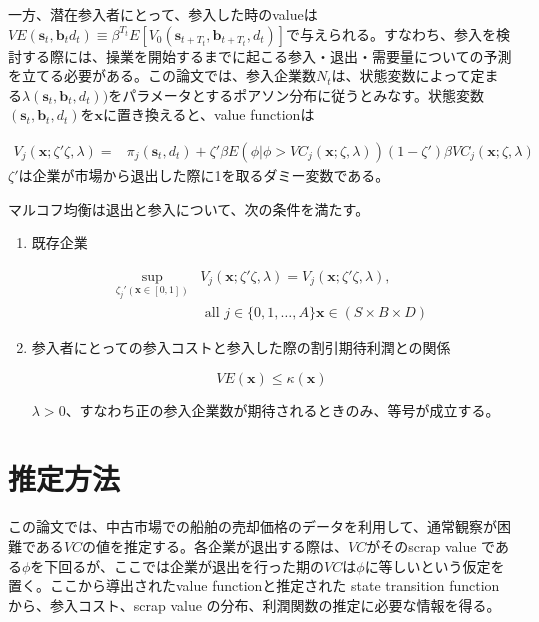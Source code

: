 \documentclass[11pt]{jsarticle}
\begin{document}
一方、潜在参入者にとって、参入した時のvalueは$VE(\mathbf{s}_t, \mathbf{b}_t d_t) \equiv \beta^{T_t}E[V_0(\mathbf{s}_{t+T_t}, \mathbf{b}_{t+T_t}, d_t)]$で与えられる。すなわち、参入を検討する際には、操業を開始するまでに起こる参入・退出・需要量についての予測を立てる必要がある。この論文では、参入企業数$N_t$は、状態変数によって定まる$\lambda(\mathbf{s}_t, \mathbf{b}_t, d_t))$をパラメータとするポアソン分布に従うとみなす。状態変数$(\mathbf{s}_t, \mathbf{b}_t, d_t)$を$\mathbf{x}$に置き換えると、value functionは

\begin{align*}
  V_j(\mathbf{x}; \zeta' \zeta, \lambda) = & \pi_j (\mathbf{s}_t, d_t) + \zeta' \beta E(\phi | \phi > VC_j(\mathbf{x}; \zeta, \lambda)) (1-\zeta') \beta VC_j (\mathbf{x}; \zeta, \lambda)
\end{align*}
$\zeta'$は企業が市場から退出した際に1を取るダミー変数である。

マルコフ均衡は退出と参入について、次の条件を満たす。

\begin{enumerate}
  \item 既存企業

  \begin{align*}
    \sup_{\zeta_j' (\mathbf{x} \in [0,1])} & V_j(\mathbf{x}; \zeta' \zeta, \lambda) = V_j(\mathbf{x}; \zeta' \zeta, \lambda), \\
    & \text{ all } j \in \{0, 1, \ldots, A \} \mathbf{x} \in (S \times B \times D)
  \end{align*}

  \item 参入者にとっての参入コストと参入した際の割引期待利潤との関係

  \[
  VE(\mathbf{x}) \leq \kappa (\mathbf{x})
  \]

  $\lambda > 0$、すなわち正の参入企業数が期待されるときのみ、等号が成立する。
\end{enumerate}

\section{推定方法}

この論文では、中古市場での船舶の売却価格のデータを利用して、通常観察が困難である$VC$の値を推定する。各企業が退出する際は、$VC$がそのscrap value である$\phi$を下回るが、ここでは企業が退出を行った期の$VC$は$\phi$に等しいという仮定を置く。ここから導出されたvalue functionと推定された state transition function から、参入コスト、scrap value の分布、利潤関数の推定に必要な情報を得る。
\end{document}
